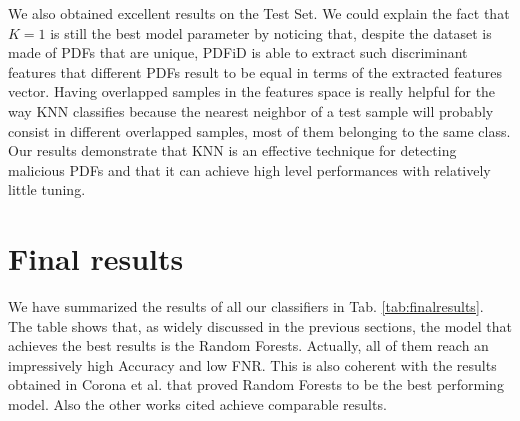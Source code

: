 \documentclass[twocolumn, switch]{article} %
\begin{document}
We also obtained excellent results on the Test Set. We could explain the fact that $K=1$ is still the best model parameter by noticing that, despite the dataset is made of PDFs that are unique, PDFiD is able to extract such discriminant features that different PDFs result to be equal in terms of the extracted features vector. Having overlapped samples in the features space is really helpful for the way KNN classifies because the nearest neighbor of a test sample will probably consist in different overlapped samples, most of them belonging to the same class.
Our results demonstrate that KNN is an effective technique for detecting malicious PDFs and that it can achieve high level performances with relatively little tuning.

\section{Final results}
\label{sec:finalresults}
We have summarized the results of all our classifiers in Tab. \ref{tab:finalresults}.
The table shows that, as widely discussed in the previous sections, the model that achieves the best results is the Random Forests. Actually, all of them reach an impressively high Accuracy and low FNR. This is also coherent with the results obtained in Corona et al. \cite{maiorca_giacinto_corona_1970} that proved Random Forests to be the best performing model. Also the other works cited achieve comparable results.
\end{document}
